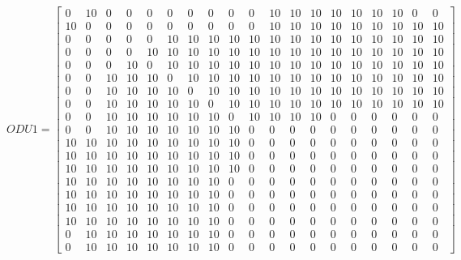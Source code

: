 \vspace{15pt}

\[
ODU1=
  \begin{bmatrix}
    0 & 10 & 0 & 0 & 0 & 0 & 0 & 0 & 0 & 0 & 10 & 10 & 10 & 10 & 10 & 10 & 10 & 0 & 0 \\
    10 & 0 & 0 & 0 & 0 & 0 & 0 & 0 & 0 & 0 & 10 & 10 & 10 & 10 & 10 & 10 & 10 & 10 & 10 \\
    0 & 0 & 0 & 0 & 0 & 10 & 10 & 10 & 10 & 10 & 10 & 10 & 10 & 10 & 10 & 10 & 10 & 10 & 10 \\
    0 & 0 & 0 & 0 & 10 & 10 & 10 & 10 & 10 & 10 & 10 & 10 & 10 & 10 & 10 & 10 & 10 & 10 & 10 \\
    0 & 0 & 0 & 10 & 0 & 10 & 10 & 10 & 10 & 10 & 10 & 10 & 10 & 10 & 10 & 10 & 10 & 10 & 10 \\
    0 & 0 & 10 & 10 & 10 & 0 & 10 & 10 & 10 & 10 & 10 & 10 & 10 & 10 & 10 & 10 & 10 & 10 & 10 \\
    0 & 0 & 10 & 10 & 10 & 10 & 0 & 10 & 10 & 10 & 10 & 10 & 10 & 10 & 10 & 10 & 10 & 10 & 10 \\
    0 & 0 & 10 & 10 & 10 & 10 & 10 & 0 & 10 & 10 & 10 & 10 & 10 & 10 & 10 & 10 & 10 & 10 & 10 \\
    0 & 0 & 10 & 10 & 10 & 10 & 10 & 10 & 0 & 10 & 10 & 10 & 10 & 0 & 0 & 0 & 0 & 0 & 0 \\
    0 & 0 & 10 & 10 & 10 & 10 & 10 & 10 & 10 & 0 & 0 & 0 & 0 & 0 & 0 & 0 & 0 & 0 & 0 \\
    10 & 10 & 10 & 10 & 10 & 10 & 10 & 10 & 10 & 0 & 0 & 0 & 0 & 0 & 0 & 0 & 0 & 0 & 0 \\
    10 & 10 & 10 & 10 & 10& 10 & 10 & 10 & 10 & 0 & 0 & 0 & 0 & 0 & 0 & 0 & 0 & 0 & 0 \\
    10 & 10 & 10 & 10 & 10 & 10 & 10 & 10 & 10 & 0 & 0 & 0 & 0 & 0 & 0 & 0 & 0 & 0 & 0 \\
    10 & 10 & 10 & 10 & 10 & 10 & 10 & 10 & 0 & 0 & 0 & 0 & 0 & 0 & 0 & 0 & 0 & 0 & 0 \\
    10 & 10 & 10 & 10 & 10 & 10 & 10 & 10 & 0 & 0 & 0 & 0 & 0 & 0 & 0 & 0 & 0 & 0 & 0 \\
    10 & 10 & 10 & 10 & 10 & 10 & 10 & 10 & 0 & 0 & 0 & 0 & 0 & 0 & 0 & 0 & 0 & 0 & 0 \\
    10 & 10 & 10 & 10 & 10 & 10 & 10 & 10 & 0 & 0 & 0 & 0 & 0 & 0 & 0 & 0 & 0 & 0 & 0 \\
    0 & 10 & 10 & 10 & 10 & 10 & 10 & 10 & 0 & 0 & 0 & 0 & 0 & 0 & 0 & 0 & 0 & 0 & 0 \\
    0 & 10 & 10 & 10 & 10 & 10 & 10 & 10 & 0 & 0 & 0 & 0 & 0 & 0 & 0 & 0 & 0 & 0 & 0
  \end{bmatrix}
\]


